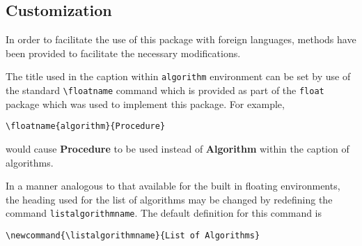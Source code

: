 \documentclass{article}
\begin{document}
\subsection{Customization}

In order to facilitate the use of this package with foreign languages,
methods have been provided to facilitate the necessary modifications.

The title used in the caption within \texttt{algorithm} environment
can be set by use of the standard \verb+\floatname+ command which is
provided as part of the \texttt{float} package which was used to
implement this package.
For example,
\begin{verbatim}
\floatname{algorithm}{Procedure}
\end{verbatim}
would cause \textbf{Procedure} to be used instead of \textbf{Algorithm}
within the caption of algorithms.

In a manner analogous to that available for the built in floating
environments, the heading used for the list of algorithms may be changed
by redefining the command \verb+listalgorithmname+.
The default definition for this command is
\begin{verbatim}
\newcommand{\listalgorithmname}{List of Algorithms}
\end{verbatim}
\end{document}
